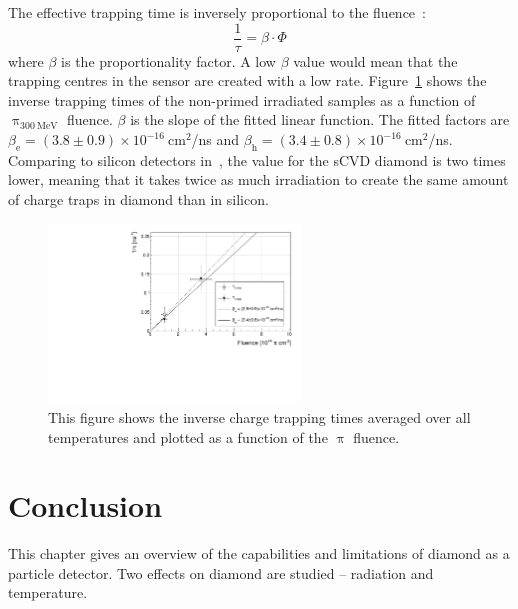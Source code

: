 The effective trapping time is inversely proportional to the fluence~\cite{Bates2005113}:
\begin{equation}
\label{eq:ltfactor}
\frac{1}{\tau} = \beta\cdot\Phi
\end{equation} 
where $\beta$ is the proportionality factor. A low $\beta$ value would mean that the trapping centres in the sensor are created with a low rate. Figure~\ref{fig:lifetimevsdose} shows the inverse trapping times of the non-primed irradiated samples as a function of $\uppi_\mathrm{300~MeV}$ fluence. $\beta$ is the slope of the fitted linear function. The fitted factors are $\beta_\mathrm{e}=(3.8\pm0.9)\times10^{-16}~$cm$^2$/ns and $\beta_\mathrm{h}=(3.4\pm0.8)\times10^{-16}~$cm$^2$/ns. Comparing to silicon detectors in~\cite{Bates2005113}, the value for the sCVD diamond is two times lower, meaning that it takes twice as much irradiation to create the same amount of charge traps in diamond than in silicon.

 


\begin{figure}[!t]
\centering
\includegraphics[width=0.6\textwidth]{03_measurement_results/scripts/plots/taunew/avglifetime1} 
\caption{This figure shows the inverse charge trapping times averaged over all temperatures and plotted as a function of the $\uppi$ fluence.}
\label{fig:lifetimevsdose}
\end{figure}








\clearpage
\section{Conclusion}
\label{sec:radlimit}
This chapter gives an overview of the capabilities and limitations of diamond as a particle detector. Two effects on diamond are studied -- radiation and temperature. 

